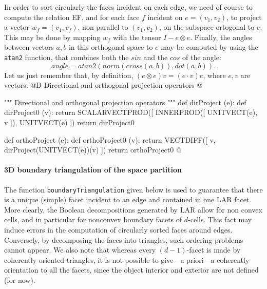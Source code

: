 \documentclass[11pt,oneside]{article}    %
\begin{document}
In order to sort circularly the faces incident on each edge, we need of course to compute the relation EF, and for each face $f$ incident on $e = (v_1,v_2)$, to project a vector $w_f = (v_1,v_f)$, non parallel to $(v_1,v_2)$, on the subspace ortogonal to $e$. This may be done by mapping $w_f$ with the tensor $I-e \otimes e$. Finally, the angles between vectors $a,b$ in this orthogonal space to $e$ may be computed by using the \texttt{atan2} function, that combines both the $sin$ and the $cos$ of the angle:
\[
angle = atan2(norm(cross(a,b)),dot(a,b)).
\]
Let us just remember that, by definition, $(e \otimes e)v = (e \cdot v)e$, where $e,v$ are vectors.
@D Directional and orthogonal projection operators
@{""" Directional and orthogonal projection operators """
def dirProject (e):
    def dirProject0 (v):
        return SCALARVECTPROD([ INNERPROD([ UNITVECT(e), v ]), UNITVECT(e) ])
    return dirProject0

def orthoProject (e):
    def orthoProject0 (v):  
        return VECTDIFF([ v, dirProject(UNITVECT(e))(v) ])
    return orthoProject0
@}




\paragraph{3D boundary triangulation of the space partition}
The function \texttt{boundaryTriangu\-la\-tion} given below is used to guarantee that there is a unique (simple) facet incident to an edge and contained in one LAR facet. More clearly, the Boolean decompositions generated by LAR allow for non convex cells, and in particular for nonconvex boundary facets of $d$-cells. This fact may induce errors in the computation of circularly sorted faces around edges. Conversely, by decomposing the faces into triangles, such ordering problems cannot appear.  
We also note that whereas every $(d-1)$-facet is made by coherently oriented triangles, it is not possible to give---a priori---a coherently orientation to all the facets, since the object interior and exterior are not defined (for now).
\end{document}

